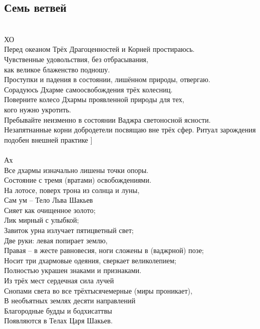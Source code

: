 \subsection*{Семь ветвей}
\\

ХО\\
Перед океаном Трёх Драгоценностей и Корней простираюсь.\\
Чувственные удовольствия, без отбрасывания, \\ \indent как великое блаженство подношу.\\
Проступки и падения в состоянии, лишённом природы, отвергаю.\\
Сорадуюсь Дхарме самоосвобождения трёх колесниц.\\
Поверните колесо Дхармы проявленной природы для тех, \\ \indent кого нужно укротить.\\
Пребывайте неизменно в состоянии Ваджра светоносной ясности.\\
Незапятнанные корни добродетели посвящаю вне трёх сфер.
\scriptsize
Ритуал зарождения подобен внешней практике
\normalsize ]
\\
\\
Ах\\
Все дхармы изначально лишены точки опоры.\\
Состояние с тремя (вратами) освобождениями.\\
На лотосе, поверх трона из солнца и луны,\\
Сам ум – Тело Льва Шакьев\\
Сияет как очищенное золото;\\
Лик мирный с улыбкой;\\
Завиток урна излучает пятицветный свет;\\
Две руки: левая попирает землю,\\
Правая – в жесте равновесия, ноги сложены в (ваджрной) позе;\\
Носит три дхармовые одеяния, сверкает великолепием;\\
Полностью украшен знаками и признаками.\\
Из трёх мест сердечная сила лучей \\
Снопами света во все трёхтысячемерные (миры проникает),\\
В необъятных землях десяти направлений\\
Благородные будды и бодхисаттвы\\
Появляются в Телах Царя Шакьев.\\
\newpage

